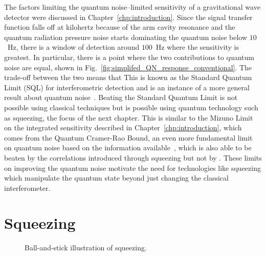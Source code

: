 The factors limiting the quantum noise--limited sensitivity of a gravitational wave detector were discussed in Chapter~\ref{chp:introduction}. Since the signal transfer function falls off at kilohertz because of the arm cavity resonance and the quantum radiation pressure noise starts dominating the quantum noise below $10$~Hz, there is a window of detection around $100$~Hz where the sensitivity is greatest. In particular, there is a point where the two contributions to quantum noise are equal, shown in Fig.~\ref{fig:simplifed_QN_response_conventional}. The trade-off between the two  means that 
This is known as the Standard Quantum Limit (SQL) for interferometric detection and is an instance of a more general result about quantum noise~\cite{}. Beating the Standard Quantum Limit is not possible using classical techniques but is possible using quantum technology such as squeezing, the focus of the next chapter. This is similar to the Mizuno Limit on the integrated sensitivity described in Chapter~\ref{chp:introduction}, which comes from the Quantum Cramer-Rao Bound, an even more fundamental limit on quantum noise based on the information available~\cite{}, which is also able to be beaten by the correlations introduced through squeezing but not by .
These limits on improving the quantum noise motivate the need for technologies like squeezing which manipulate the quantum state beyond just changing the classical interferometer.



\section{Squeezing}

\begin{figure}
	\centering
	\caption{Ball-and-stick illustration of squeezing.}
	\label{fig:ballandstick_simple}
\end{figure}

